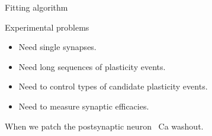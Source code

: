 \documentclass{beamer}%
\begin{document}
\begin{frame}{Fitting algorithm}
\begin{center}
 \end{center}
%
\end{frame}



\begin{frame}{Experimental problems}
%
 \begin{itemize}
   \item Need single synapses.
   \item Need long sequences of plasticity events.
   \item Need to control types of candidate plasticity events.
   \item Need to measure synaptic efficacies.
 \end{itemize}

 \vp When we patch the postsynaptic neuron \lto\ Ca washout.
%
\end{frame}

\end{document}
